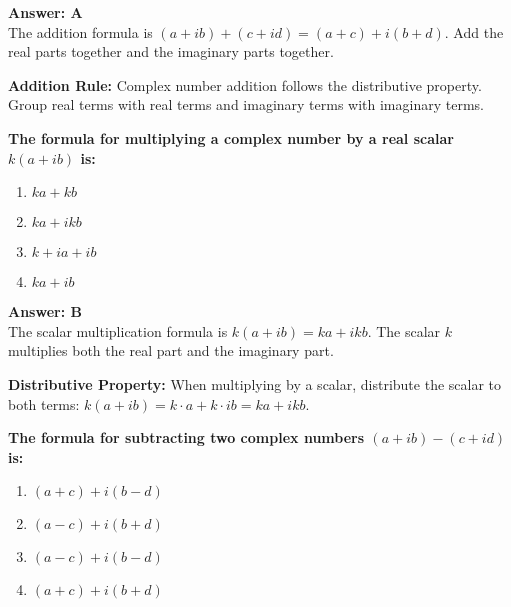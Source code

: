 \documentclass[12pt,a4paper]{article}
\begin{document}
\begin{answerstyle}
\textbf{Answer: A} \\
The addition formula is \( (a + ib) + (c + id) = (a + c) + i(b + d) \). Add the real parts together and the imaginary parts together.
\end{answerstyle}

\begin{conceptbox}
\textbf{Addition Rule:} Complex number addition follows the distributive property. Group real terms with real terms and imaginary terms with imaginary terms.
\end{conceptbox}

\newpage
\begin{questiontitle}[MCQ 42]
\textbf{The formula for multiplying a complex number by a real scalar \( k(a + ib) \) is:}
\end{questiontitle}

\begin{partbox}[Options]
\begin{enumerate}[label=\Alph*.]
    \item \( ka + kb \)
    \item \( ka + ikb \)
    \item \( k + ia + ib \)
    \item \( ka + ib \)
\end{enumerate}
\end{partbox}

\begin{answerstyle}
\textbf{Answer: B} \\
The scalar multiplication formula is \( k(a + ib) = ka + ikb \). The scalar \( k \) multiplies both the real part and the imaginary part.
\end{answerstyle}

\begin{conceptbox}
\textbf{Distributive Property:} When multiplying by a scalar, distribute the scalar to both terms: \( k(a + ib) = k \cdot a + k \cdot ib = ka + ikb \).
\end{conceptbox}

\newpage
\begin{questiontitle}[MCQ 43]
\textbf{The formula for subtracting two complex numbers \( (a + ib) - (c + id) \) is:}
\end{questiontitle}

\begin{partbox}[Options]
\begin{enumerate}[label=\Alph*.]
    \item \( (a + c) + i(b - d) \)
    \item \( (a - c) + i(b + d) \)
    \item \( (a - c) + i(b - d) \)
    \item \( (a + c) + i(b + d) \)
\end{enumerate}
\end{partbox}
\end{document}

